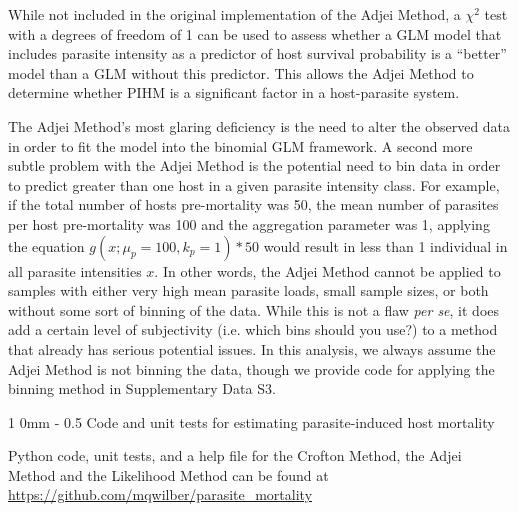 \documentclass[12pt, a4paper]{article}
\makeatletter
\renewcommand{\section}{\@startsection
{section}%
{1}%
{0mm}%
{-\baselineskip}%
{0.5\baselineskip}%
{\normalfont\bf\large}} %
\makeatother
\begin{document}
While not included in the original implementation of the Adjei Method, a
$\chi^2$ test with a degrees of freedom of 1 can be used to assess whether a GLM model that includes parasite
intensity as a predictor of host survival probability is a ``better'' model than a
GLM without this predictor.  This allows the Adjei Method to determine whether
PIHM is a significant factor in a host-parasite system.

The Adjei Method's most glaring deficiency is the need to alter the observed
data in order to fit the model into the binomial GLM framework.  A second more
subtle problem with the Adjei Method is the potential need to bin data in order
to predict greater than one host in a given parasite intensity class.  For
example, if the total number of hosts pre-mortality was 50, the mean number of
parasites per host pre-mortality was 100 and the aggregation parameter was 1, applying the equation $g(x ; \mu_p=100, k_p=1) * 50$ would result in
less than 1 individual in all parasite intensities $x$. In other words, the
Adjei Method cannot be applied to samples with either very high mean parasite
loads, small sample sizes, or both without some sort of binning of the data.
While this is not a flaw \emph{per se}, it does add a certain level of
subjectivity (i.e. which bins should you use?) to a method that already has
serious potential issues.  In this analysis, we always assume the Adjei Method is not binning the data, though we provide code for applying the binning method in Supplementary Data S3.


\section{Code and unit tests for estimating parasite-induced host mortality}

Python code, unit tests, and a help file for the Crofton Method, the Adjei Method and the Likelihood Method can be found at \url{https://github.com/mqwilber/parasite_mortality}


\singlespacing






\end{document}
